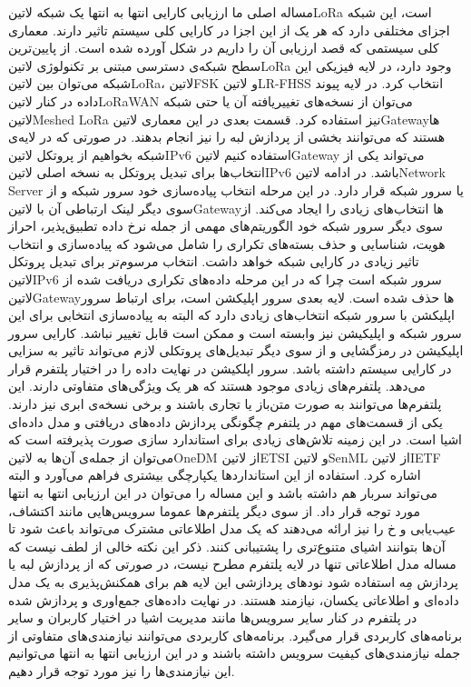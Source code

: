 
مساله اصلی ما ارزیابی کارایی انتها به انتها یک شبکه ‌لاتین{LoRa} است، این شبکه اجزای مختلفی دارد که هر یک از این اجزا در کارایی کلی سیستم تاثیر دارند.
معماری کلی سیستمی که قصد ارزیابی آن را داریم در شکل  آورده شده است.
از پایین‌ترین سطح شبکه‌ی دسترسی مبتنی بر تکنولوژی ‌لاتین{LoRa} وجود دارد، در لایه فیزیکی این شبکه می‌توان بین ‌لاتین{LoRa}، ‌لاتین{FSK}
و ‌لاتین{LR-FHSS} انتخاب کرد. در لایه پیوند داده در کنار ‌لاتین{LoRaWAN} می‌توان از نسخه‌های تغییریافته آن یا حتی شبکه ‌لاتین{Meshed LoRa} نیز استفاده کرد.
قسمت بعدی در این معماری ‌لاتین{Gateway}ها هستند که می‌توانند بخشی از پردازش لبه را نیز انجام بدهند. در صورتی که در لایه‌ی شبکه بخواهیم از پروتکل ‌لاتین{IPv6} استفاده کنیم
‌لاتین{Gateway} می‌تواند یکی از انتخاب‌ها برای تبدیل پروتکل به نسخه اصلی ‌لاتین{IPv6} باشد.
در ادامه ‌لاتین{Network Server} یا سرور شبکه قرار دارد. در این مرحله انتخاب پیاده‌سازی خود سرور شبکه و از سوی دیگر لینک ارتباطی آن با
‌لاتین{Gateway}ها انتخاب‌های زیادی را ایجاد می‌کند. از سوی دیگر سرور شبکه خود الگوریتم‌های مهمی از جمله نرخ داده تطبیق‌پذیر، احراز هویت، شناسایی و حذف بسته‌های تکراری را شامل می‌شود
که پیاده‌سازی و انتخاب تاثیر زیادی در کارایی شبکه خواهد داشت. انتخاب مرسوم‌تر برای تبدیل پروتکل ‌لاتین{IPv6} سرور شبکه است چرا که در این مرحله داده‌های تکراری دریافت شده از
‌لاتین{Gateway}ها حذف شده است.
لایه بعدی سرور اپلیکشن است، برای ارتباط سرور اپلیکشن با سرور شبکه انتخاب‌های زیادی دارد که البته به پیاده‌سازی انتخابی برای این سرور شبکه و اپلیکیشن نیز وابسته است
و ممکن است قابل تغییر نباشد. کارایی سرور اپلیکیشن در رمزگشایی و از سوی دیگر تبدیل‌های پروتکلی لازم می‌تواند تاثیر به سزایی در کارایی سیستم داشته باشد.
سرور اپلکیشن در نهایت داده را در اختیار پلتفرم قرار می‌دهد. پلتفرم‌های زیادی موجود هستند که هر یک ویژگی‌های متفاوتی دارند.
این پلتفرم‌ها می‌توانند به صورت متن‌باز یا تجاری باشند و برخی نسخه‌ی ابری نیز دارند.
یکی از قسمت‌های مهم
در پلتفرم چگونگی پردازش داده‌های دریافتی و مدل داده‌ای اشیا است. در این زمینه تلاش‌های زیادی برای استاندارد سازی صورت پذیرفته است که می‌توان از
جمله‌ی آن‌ها به ‌لاتین{OneDM} از ‌لاتین{ETSI} و ‌لاتین{SenML} از ‌لاتین{IETF} اشاره کرد. استفاده از این استانداردها یکپارچگی
بیشتری فراهم می‌آورد و البته می‌تواند سربار هم داشته باشد و این مساله را می‌توان در این ارزیابی انتها به انتها مورد توجه قرار داد.
از سوی دیگر پلتفرم‌ها عموما سرویس‌هایی مانند اکتشاف، عیب‌یابی و ‌خ را نیز ارائه می‌دهند که یک مدل اطلاعاتی مشترک می‌تواند باعث شود تا آن‌ها
بتوانند اشیای متنوع‌تری را پشتیبانی کنند.
ذکر این نکته خالی از لطف نیست که مساله مدل اطلاعاتی تنها در لایه پلتفرم مطرح نیست، در صورتی که از پردازش لبه یا پردازش مِه استفاده شود نودهای پردازشی این لایه
هم برای همکنش‌پذیری به یک مدل داده‌ای و اطلاعاتی یکسان، نیازمند هستند.
در نهایت داده‌های جمع‌اوری و پردازش شده در پلتفرم در کنار سایر سرویس‌ها مانند مدیریت اشیا در اختیار کاربران و سایر برنامه‌های کاربردی قرار می‌گیرد.
برنامه‌های کاربردی می‌توانند نیازمندی‌های متفاوتی از جمله نیازمندی‌های کیفیت سرویس داشته باشند و در این ارزیابی انتها به انتها می‌توانیم این نیازمندی‌ها را
نیز مورد توجه قرار دهیم.

